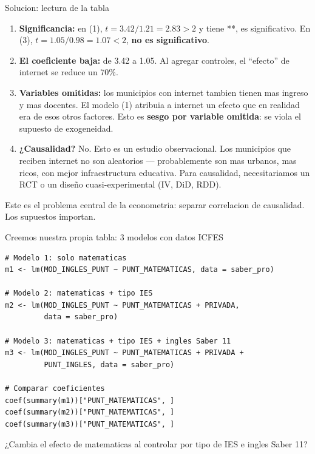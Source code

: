 \documentclass[aspectratio=169, 11pt]{beamer}
\begin{document}
\begin{frame}{Solucion: lectura de la tabla}
\small
\begin{enumerate}\setlength{\itemsep}{3pt}
  \item \textbf{Significancia:} en (1), $t = 3.42/1.21 = 2.83 > 2$ y tiene **, es significativo. En (3), $t = 1.05/0.98 = 1.07 < 2$, \textbf{no es significativo}.

  \item \textbf{El coeficiente baja:} de 3.42 a 1.05. Al agregar controles, el ``efecto'' de internet se reduce un 70\%.

  \item \textbf{Variables omitidas:} los municipios con internet tambien tienen mas ingreso y mas docentes. El modelo (1) atribuia a internet un efecto que en realidad era de esos otros factores. Esto es \textbf{sesgo por variable omitida}: se viola el supuesto de exogeneidad.

  \item \textbf{¿Causalidad?} No. Esto es un estudio observacional. Los municipios que reciben internet no son aleatorios --- probablemente son mas urbanos, mas ricos, con mejor infraestructura educativa. Para causalidad, necesitariamos un RCT o un dise\~no cuasi-experimental (IV, DiD, RDD).
\end{enumerate}

\vspace{0.1cm}
\begin{alertblock}{}
\small Este es el problema central de la econometria: separar correlacion de causalidad. Los supuestos importan.
\end{alertblock}
\end{frame}

\begin{frame}[fragile]{Creemos nuestra propia tabla: 3 modelos con datos ICFES}
\begin{lstlisting}[basicstyle=\ttfamily\scriptsize]
# Modelo 1: solo matematicas
m1 <- lm(MOD_INGLES_PUNT ~ PUNT_MATEMATICAS, data = saber_pro)

# Modelo 2: matematicas + tipo IES
m2 <- lm(MOD_INGLES_PUNT ~ PUNT_MATEMATICAS + PRIVADA,
         data = saber_pro)

# Modelo 3: matematicas + tipo IES + ingles Saber 11
m3 <- lm(MOD_INGLES_PUNT ~ PUNT_MATEMATICAS + PRIVADA +
         PUNT_INGLES, data = saber_pro)

# Comparar coeficientes
coef(summary(m1))["PUNT_MATEMATICAS", ]
coef(summary(m2))["PUNT_MATEMATICAS", ]
coef(summary(m3))["PUNT_MATEMATICAS", ]
\end{lstlisting}

\vspace{0.1cm}
\small ¿Cambia el efecto de matematicas al controlar por tipo de IES e ingles Saber 11?
\end{frame}
\end{document}
